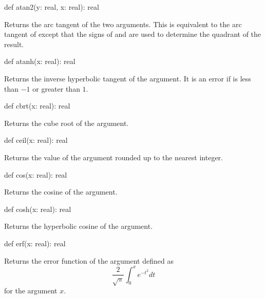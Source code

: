 \begin{protohead}
def atan2(y: real, x: real): real
\end{protohead}
\begin{protobody}
Returns the arc tangent of the two arguments.  This is equivalent to
the arc tangent of  except that the signs of 
and  are used to determine the quadrant of the result.
\end{protobody}

\begin{protohead}
def atanh(x: real): real
\end{protohead}
\begin{protobody}
Returns the inverse hyperbolic tangent of the argument.  It is an error
if  is less than $-1$ or greater than $1$.
\end{protobody}

\begin{protohead}
def cbrt(x: real): real
\end{protohead}
\begin{protobody}
Returns the cube root of the argument.
\end{protobody}

\begin{protohead}
def ceil(x: real): real
\end{protohead}
\begin{protobody}
Returns the value of the argument rounded up to the nearest integer.
\end{protobody}

\begin{protohead}
def cos(x: real): real
\end{protohead}
\begin{protobody}
Returns the cosine of the argument.
\end{protobody}

\begin{protohead}
def cosh(x: real): real
\end{protohead}
\begin{protobody}
Returns the hyperbolic cosine of the argument.
\end{protobody}

\begin{protohead}
def erf(x: real): real
\end{protohead}
\begin{protobody}
Returns the error function of the argument defined as
$$\frac{2}{\sqrt{\pi}}\int^x_0e^{-t^2}dt$$
for the argument $x$.
\end{protobody}

